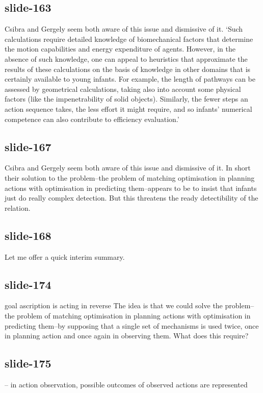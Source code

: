 \documentclass[12pt,\papersize]{extarticle}
\begin{document}
 
\subsection{slide-163}
Csibra and Gergely seem both aware of this issue and dismissive of it.
`Such calculations require detailed knowledge of biomechanical factors that determine the motion capabilities and energy expenditure of agents. However, in the absence of such knowledge, one can appeal to heuristics that approximate the results of these calculations on the basis of knowledge in other domains that is certainly available to young infants. For example, the length of pathways can be assessed by geometrical calculations, taking also into account some physical factors (like the impenetrability of solid objects). Similarly, the fewer steps an action sequence takes, the less effort it might require, and so infants’ numerical competence can also contribute to efficiency evaluation.’
 
 
\subsection{slide-167}
Csibra and Gergely seem both aware of this issue and dismissive of it. In short their solution to the problem--the problem of matching optimisation in planning actions with optimisation in predicting them--appears to be to insist that infants just do really complex detection. But this threatens the ready detectibility of the relation.
 
 
\subsection{slide-168}
Let me offer a quick interim summary.
 
 
\subsection{slide-174}
goal ascription is acting in reverse
The idea is that we could solve the problem--the problem of matching optimisation in planning actions with optimisation in predicting them--by supposing that a single set of mechanisms is used twice, once in planning action and once again in observing them.
What does this require?
 
 
\subsection{slide-175}
-- in action observation, possible outcomes of observed actions are represented
 
\end{document}
